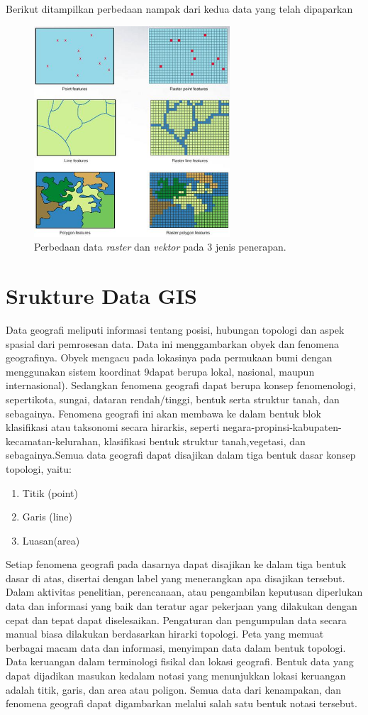 Berikut ditampilkan perbedaan nampak dari kedua data yang telah dipaparkan
		\begin{figure}[htbp]
		\centering
		\includegraphics[width=0.65\textwidth]{pictures/perbedaan.jpg}
		\caption{Perbedaan data \textit{raster} dan \textit{vektor} pada 3 jenis penerapan.}
		\label{labelgambar6}
		\end{figure}
\section{Srukture Data GIS}
Data geografi meliputi informasi tentang posisi, hubungan topologi dan aspek spasial dari pemrosesan data. Data ini menggambarkan obyek dan fenomena geografinya. Obyek mengacu pada lokasinya pada permukaan bumi dengan menggunakan sistem koordinat 9dapat berupa lokal, nasional, maupun internasional). Sedangkan fenomena geografi dapat berupa konsep fenomenologi, sepertikota, sungai, dataran rendah/tinggi, bentuk serta struktur tanah, dan sebagainya. Fenomena geografi ini akan membawa ke dalam bentuk blok klasifikasi atau taksonomi secara hirarkis, seperti negara-propinsi-kabupaten-kecamatan-kelurahan, klasifikasi bentuk struktur tanah,vegetasi, dan sebagainya.Semua data geografi dapat disajikan dalam tiga bentuk dasar konsep topologi, yaitu:
\begin{enumerate}
\item Titik (point)
\item Garis (line)
\item Luasan(area)
\end{enumerate}
Setiap fenomena geografi pada dasarnya dapat disajikan ke dalam tiga bentuk dasar di atas, disertai dengan label yang menerangkan apa disajikan tersebut. Dalam aktivitas penelitian, perencanaan, atau pengambilan keputusan diperlukan data dan informasi yang baik dan teratur agar pekerjaan yang dilakukan dengan cepat dan tepat dapat diselesaikan. Pengaturan dan pengumpulan data secara manual biasa dilakukan berdasarkan hirarki topologi. Peta yang memuat berbagai macam data dan informasi, menyimpan data dalam bentuk topologi. Data keruangan dalam terminologi fisikal dan lokasi geografi. Bentuk data yang dapat dijadikan masukan kedalam notasi yang menunjukkan lokasi keruangan adalah titik, garis, dan area atau poligon. Semua data dari kenampakan, dan fenomena geografi dapat digambarkan melalui salah satu bentuk notasi tersebut.
